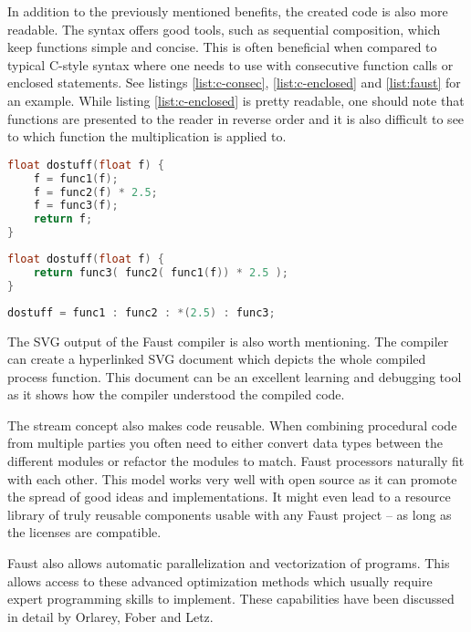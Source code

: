\documentclass[11pt,a4paper]{article}
\begin{document}
In addition to the previously mentioned benefits, the created code is also more readable. The syntax offers good tools, such as sequential composition, which keep functions simple and concise. This is often beneficial when compared to typical C-style syntax where one needs to use with consecutive function calls or enclosed statements. See listings \ref{list:c-consec}, \ref{list:c-enclosed} and \ref{list:faust} for an example. While listing \ref{list:c-enclosed} is pretty readable, one should note that functions are presented to the reader in reverse order and it is also difficult to see to which function the multiplication is applied to.

\begin{lstlisting}[language=C,label=list:c-consec,caption=Consecutive calls]
float dostuff(float f) {
	f = func1(f);
	f = func2(f) * 2.5;
	f = func3(f);
	return f;
}
\end{lstlisting}

\begin{lstlisting}[language=C,label=list:c-enclosed,caption=Enclosed statements]
float dostuff(float f) {
	return func3( func2( func1(f)) * 2.5 );
}
\end{lstlisting}

\begin{lstlisting}[language=C,label=list:faust,caption=Faust sequential composition]
dostuff = func1 : func2 : *(2.5) : func3;
\end{lstlisting}

The SVG output of the Faust compiler is also worth mentioning. The compiler can create a hyperlinked SVG document which depicts the whole compiled process function. This document can be an excellent learning and debugging tool as it shows how the compiler understood the compiled code.

The stream concept also makes code reusable. When combining procedural code from multiple parties you often need to either convert data types between the different modules or refactor the modules to match. Faust processors naturally fit with each other. This model works very well with open source as it can promote the spread of good ideas and implementations. It might even lead to a resource library of truly reusable components usable with any Faust project -- as long as the licenses are compatible.

Faust also allows automatic parallelization and vectorization of programs. This allows access to these advanced optimization methods which usually require expert programming skills to implement. These capabilities have been discussed in detail by Orlarey, Fober and Letz\cite{orlarey:09a}.
\end{document}
